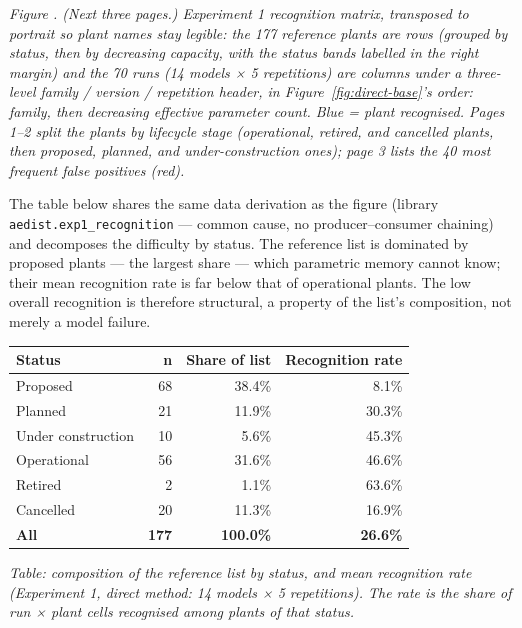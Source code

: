 \documentclass[a4paper,11pt]{article}
\begin{document}
\label{fig:recognition-matrix}
\noindent\emph{Figure \thefigure. (Next three pages.) Experiment 1 recognition
matrix, transposed to portrait so plant names stay legible: the 177 reference
plants are rows (grouped by status, then by decreasing capacity, with the status
bands labelled in the right margin) and the 70 runs (14 models × 5 repetitions)
are columns under a three-level family / version / repetition header, in
Figure~\ref{fig:direct-base}'s order: family, then decreasing effective parameter
count. Blue = plant recognised. Pages 1--2 split the plants by lifecycle stage
(operational, retired, and cancelled plants, then proposed, planned, and
under-construction ones); page 3 lists the 40 most frequent false positives
(red).}


The table below shares the same data derivation as the figure (library
\texttt{aedist.exp1\_recognition} --- common cause, no
producer--consumer chaining) and decomposes the difficulty by status.
The reference list is dominated by proposed plants --- the largest share
--- which parametric memory cannot know; their mean recognition rate is
far below that of operational plants. The low overall recognition is
therefore structural, a property of the list's composition, not merely a
model failure.

\begin{longtable}[]{@{}lrrr@{}}
\toprule\noalign{}
Status & n & Share of list & Recognition rate \\
\midrule\noalign{}
\endhead
\bottomrule\noalign{}
\endlastfoot
Proposed & 68 & 38.4\% & 8.1\% \\
Planned & 21 & 11.9\% & 30.3\% \\
Under construction & 10 & 5.6\% & 45.3\% \\
Operational & 56 & 31.6\% & 46.6\% \\
Retired & 2 & 1.1\% & 63.6\% \\
Cancelled & 20 & 11.3\% & 16.9\% \\
\textbf{All} & \textbf{177} & \textbf{100.0\%} & \textbf{26.6\%} \\
\end{longtable}

\emph{Table: composition of the reference list by status, and mean
recognition rate (Experiment 1, direct method: 14 models × 5
repetitions). The rate is the share of run × plant cells recognised
among plants of that status.}
\end{document}

